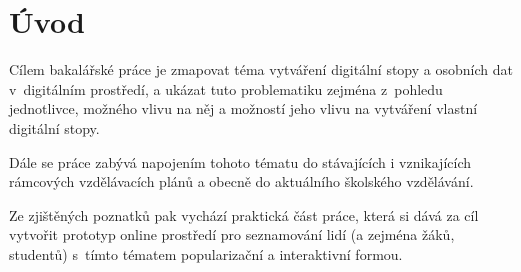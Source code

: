 \chapter*{Úvod}
\pagestyle{plain}

Cílem bakalářské práce je zmapovat téma vytváření digitální stopy a osobních dat v~digitálním prostředí, a ukázat tuto problematiku zejména z~pohledu jednotlivce, možného vlivu na něj a možností jeho vlivu na vytváření vlastní digitální stopy.

Dále se práce zabývá napojením tohoto tématu do stávajících i vznikajících rámcových vzdělávacích plánů a obecně do aktuálního školského vzdělávání.

Ze zjištěných poznatků pak vychází praktická část práce, která si dává za cíl vytvořit prototyp online prostředí pro seznamování lidí (a zejména žáků, studentů) s~tímto tématem popularizační a interaktivní formou.
